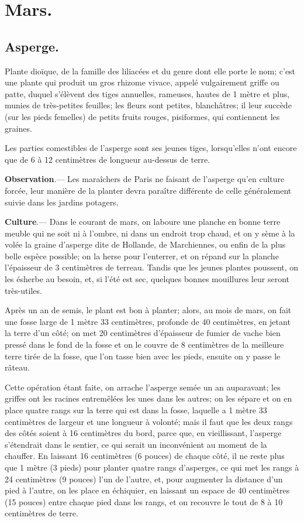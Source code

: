 \documentclass[10pt,a4paper]{book}
\begin{document}
\section{Mars.}

\subsection{Asperge.}

Plante dioïque, de la famille des liliacées et du genre dont elle porte le nom; c'est une plante qui produit un gros rhizome vivace, appelé vulgairement griffe ou patte, duquel s'élèvent des tiges annuelles, rameuses, hautes de 1 mètre et plus, munies de très-petites feuilles; les fleurs sont petites, blanchâtres; il leur succède (sur les pieds femelles) de petits fruits rouges, pisiformes, qui contiennent les graines.

Les parties comestibles de l'asperge sont ses jeunes tiges, lorsqu'elles n'ont encore que de 6 à 12 centimètres de longueur au-dessus de terre.

{\small \textbf{Observation}.--- Les maraîchers de Paris ne faisant de l'asperge qu'en culture forcée, leur manière de la planter devra paraître différente de celle généralement suivie dans les jardins potagers.}

\textbf{Culture}.--- Dans le courant de mars, on laboure une planche en bonne terre meuble qui ne soit ni à l'ombre, ni dans un endroit trop chaud, et on y sème à la volée la graine d'asperge dite de Hollande, de Marchiennes, ou enfin de la plus belle espèce possible; on la herse pour l'enterrer, et on répand sur la planche l'épaisseur de 3 centimètres de terreau. Tandis que les jeunes plantes poussent, on les ésherbe au besoin, et, si l'été est sec, quelques bonnes mouillures leur seront très-utiles.

Après un an de semis, le plant est bon à planter; alors, au mois de mars, on fait une fosse large de 1 mètre 33 centimètres, profonde de 40 centimètres, en jetant la terre d'un côté; on met 20 centimètres d'épaisseur de fumier de vache bien pressé dans le fond de la fosse et on le couvre de 8 centimètres de la meilleure terre tirée de la fosse, que l'on tasse bien avec les pieds, ensuite on y passe le râteau.

Cette opération étant faite, on arrache l'asperge semée un an auparavant; les griffes ont les racines entremêlées les unes dans les autres; on les sépare et on en place quatre rangs sur la terre qui est dans la fosse, laquelle a 1 mètre 33 centimètres de largeur et une longueur à volonté; mais il faut que les deux rangs des côtés soient à 16 centimètres du bord, parce que, en vieillissant, l'asperge s'étendrait dans le sentier, ce qui serait un inconvénient au moment de la chauffer. En laissant 16 centimètres (6 pouces) de chaque côté, il ne reste plus que 1 mètre (3 pieds) pour planter quatre rangs d'asperges, ce qui met les rangs à 24 centimètres (9 pouces) l'un de l'autre, et, pour augmenter la distance d'un pied à l'autre, on les place en échiquier, en laissant un espace de 40 centimètres (15 pouces) entre chaque pied dans les rangs, et on recouvre le tout de 8 à 10 centimètres de terre.
\end{document}
